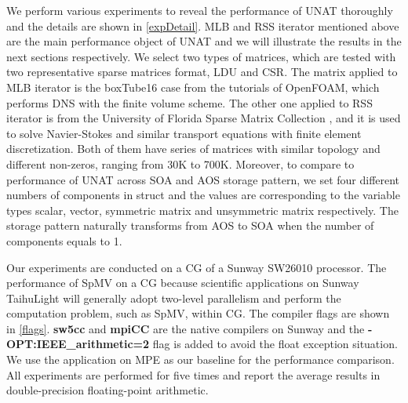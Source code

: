 \documentclass[conference]{IEEEtran}
\begin{document}
We perform various experiments to reveal the performance of UNAT thoroughly and the details are shown in \ref{expDetail}. MLB and RSS iterator mentioned above are the main performance object of UNAT and we will illustrate the results in the next sections respectively. We select two types of matrices, which are tested with two representative sparse matrices format, LDU and CSR. The matrix applied to MLB iterator is the boxTube16 case from the tutorials of OpenFOAM, which performs DNS with the finite volume scheme. The other one applied to RSS iterator is from the University of Florida Sparse Matrix Collection \cite{b9}, and it is used to solve Navier-Stokes and similar transport equations with finite element discretization. Both of them have series of matrices with similar topology and different non-zeros, ranging from 30K to 700K. Moreover, to compare to performance of UNAT across SOA and AOS storage pattern, we set four different numbers of components in struct and the values are corresponding to the variable types scalar, vector, symmetric matrix and unsymmetric matrix respectively. The storage pattern naturally transforms from AOS to SOA when the number of components equals to 1.

Our experiments are conducted on a CG of a Sunway SW26010 processor. The performance of SpMV on a CG because scientific applications on Sunway TaihuLight will generally adopt two-level parallelism and perform the computation problem, such as SpMV, within CG. The compiler flags are shown in \ref{flags}. \textbf{sw5cc} and \textbf{mpiCC} are the native compilers on Sunway and the \textbf{-OPT:IEEE\_arithmetic=2} flag is added to avoid the float exception situation. We use the application on MPE as our baseline for the performance comparison. All experiments are performed for five times and report the average results in double-precision floating-point arithmetic.
\end{document}
